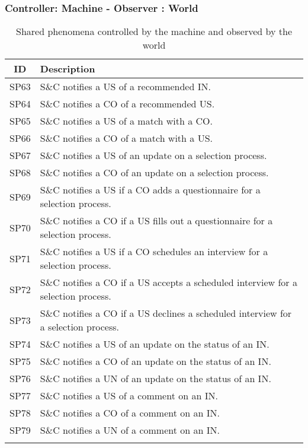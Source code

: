 \subsubsection{Controller: Machine - Observer : World}
\renewcommand{\arraystretch}{1.5}
\begin{longtable}{|c|p{10.5cm}|}
    \hline \rowcolor{polimiblue!40}
    \textbf{ID} & \textbf{Description} \\ \hline
    SP63 & S\&C notifies a US of a recommended IN. \\ \hline
    SP64 & S\&C notifies a CO of a recommended US. \\ \hline
    SP65 & S\&C notifies a US of a match with a CO. \\ \hline
    SP66 & S\&C notifies a CO of a match with a US. \\ \hline
    SP67 & S\&C notifies a US of an update on a selection process. \\ \hline
    SP68 & S\&C notifies a CO of an update on a selection process. \\ \hline
    SP69 & S\&C notifies a US if a CO adds a questionnaire for a selection process. \\ \hline
    SP70 & S\&C notifies a CO if a US fills out a questionnaire for a selection process. \\ \hline
    SP71 & S\&C notifies a US if a CO schedules an interview for a selection process. \\ \hline
    SP72 & S\&C notifies a CO if a US accepts a scheduled interview for a selection process. \\ \hline
    SP73 & S\&C notifies a CO if a US declines a scheduled interview for a selection process. \\ \hline
    SP74 & S\&C notifies a US of an update on the status of an IN. \\ \hline
    SP75 & S\&C notifies a CO of an update on the status of an IN. \\ \hline
    SP76 & S\&C notifies a UN of an update on the status of an IN. \\ \hline
    SP77 & S\&C notifies a US of a comment on an IN. \\ \hline
    SP78 & S\&C notifies a CO of a comment on an IN. \\ \hline
    SP79 & S\&C notifies a UN of a comment on an IN. \\ \hline
\caption{Shared phenomena controlled by the machine and observed by the world}
\end{longtable}

